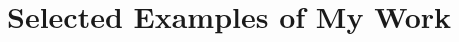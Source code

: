 \documentclass[12pt,english]{scrartcl}
\begin{document}
\section{Selected Examples of My Work}

\begin{comment}
\begin{description}
\item [{Peer-reviewed~journal~article}] Sean D. G. Marshall, Aubrey Moore,
Maclean Vaqalo, Alasdair Noble, and Trevor A. Jackson, \textquotedbl A
new haplotype of the coconut rhinoceros beetle, \emph{Oryctes rhinoceros},
has escaped biological control by \emph{Oryctes rhinoceros} nudivirus
and is invading Pacific Islands'', Journal of Invertebrate Pathology
149 (2017), pp. 127-{}-134.\cite{marshall2017anew}
\item [{Peer-reviewed~journal~article}] Jake Manuel, W. John Tennent,
Donald W. Buden, and Aubrey Moore, \textquotedbl First record of
\emph{Doleschallia tongana} (Lepidoptera: Nymphalidae) for Guam Island\textquotedbl ,
F1000Research 7 (2018), pp. 366.\cite{manuel2018firstrecord}
\item [{Grant~proposal}] Aubrey Moore, \textquotedbl DOI Proposal: Biological
Control of Coconut Rhinoceros Beetle Biotype G in Micronesia\textquotedbl{}
(2017).\cite{moore2017doiproposal}
\item [{Grant~proposal}] Aubrey Moore, \textquotedbl McIntire-Stennis
Proposal: Guam Forest Biodiversity Inventory\textquotedbl{} (2018).\cite{moore2018mcintirestennis}
\item [{Magazine~article}] Aubrey Moore, \textquotedbl Special Report
for Guam Invasive Species Awareness Week: Invasive Species are a Crisis
for Guam and the Pacific, Right Now\textquotedbl , Pacific Island
Times (2018).\cite{moore2018special}
\item [{Oral~presentation~slide~set}] Aubrey Moore, \textquotedbl Building
a Terrestrial Biodiversity Inventory for Guam\textquotedbl{} (2018).\cite{moore2018building}
\item [{Web~site}] \cite{moore2018crbgwiki} Aubrey Moore, \textquotedbl CRB-G
Wiki - CRB-G Wiki\textquotedbl{} (2018).
\end{description}
\raggedright\vspace{2mm}\textbf{Reference(s)}\begin{btSect}[vancouver]{zotero}
\btPrintCited
\end{btSect}
\end{btUnit}

\end{comment}

\clearpage
\begin{refsection}
\nocite{*}
\printbibliography[title={MooreAfter2017.bib}]
\end{refsection}
\end{document}
